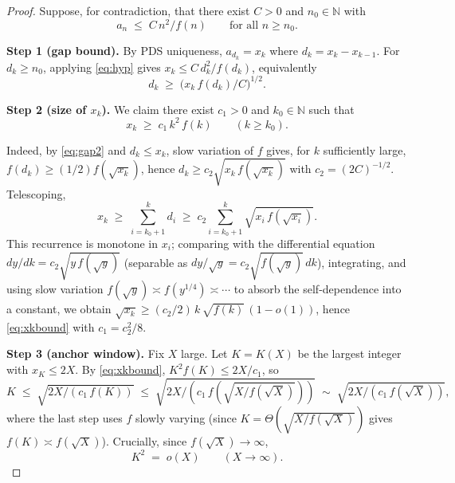\documentclass[11pt]{article}
\begin{document}
\begin{proof}
Suppose, for contradiction, that there exist $C > 0$ and $n_0 \in \mathbb{N}$
with
\begin{equation}\label{eq:hyp}
   a_n \;\leq\; C\, n^2 / f(n)  \qquad \text{for all } n \geq n_0.
\end{equation}

\medskip
\noindent \textbf{Step 1 (gap bound).}
By PDS uniqueness, $a_{d_k} = x_k$ where $d_k = x_k - x_{k-1}$.
For $d_k \geq n_0$, applying \eqref{eq:hyp} gives
$x_k \leq C\, d_k^2 / f(d_k)$, equivalently
\begin{equation}\label{eq:gap2}
   d_k \;\geq\; \bigl( x_k\, f(d_k) / C \bigr)^{1/2}.
\end{equation}

\medskip
\noindent \textbf{Step 2 (size of $x_k$).}
We claim there exist $c_1 > 0$ and $k_0 \in \mathbb{N}$ such that
\begin{equation}\label{eq:xkbound}
   x_k \;\geq\; c_1\, k^2\, f(k) \qquad (k \geq k_0).
\end{equation}

Indeed, by \eqref{eq:gap2} and $d_k \leq x_k$, slow variation of $f$ gives,
for $k$ sufficiently large,
$f(d_k) \geq (1/2) f(\sqrt{x_k})$, hence
$d_k \geq c_2 \sqrt{x_k\, f(\sqrt{x_k})}$ with
$c_2 = (2C)^{-1/2}$. Telescoping,
\[
   x_k \;\geq\; \sum_{i=k_0+1}^k d_i
        \;\geq\; c_2 \sum_{i=k_0+1}^k \sqrt{x_i\, f(\sqrt{x_i})}.
\]
This recurrence is monotone in $x_i$; comparing with the differential
equation $dy/dk = c_2 \sqrt{y\, f(\sqrt{y})}$ (separable as
$dy/\sqrt{y} = c_2 \sqrt{f(\sqrt y)}\, dk$), integrating, and using slow
variation $f(\sqrt y) \asymp f(y^{1/4}) \asymp \cdots$ to absorb the
self-dependence into a constant, we obtain
$\sqrt{x_k} \geq (c_2/2)\, k\, \sqrt{f(k)}\, (1 - o(1))$, hence
\eqref{eq:xkbound} with $c_1 = c_2^2/8$.

\medskip
\noindent \textbf{Step 3 (anchor window).}
Fix $X$ large. Let $K = K(X)$ be the largest integer with $x_K \leq 2X$.
By \eqref{eq:xkbound}, $K^2 f(K) \leq 2X / c_1$, so
\begin{equation}\label{eq:Kbound}
   K \;\leq\; \sqrt{2X / (c_1\, f(K))}
     \;\leq\; \sqrt{2X / (c_1\, f(\sqrt{X/f(\sqrt{X})}))}
     \;\sim\; \sqrt{2X / (c_1\, f(\sqrt X))},
\end{equation}
where the last step uses $f$ slowly varying (since $K = \Theta(\sqrt{X/f(\sqrt X)})$
gives $f(K) \asymp f(\sqrt X)$). Crucially, since $f(\sqrt X) \to \infty$,
\begin{equation}\label{eq:Klittleo}
   K^2 \;=\; o(X) \qquad (X \to \infty).
\end{equation}


\end{proof}
\end{document}
